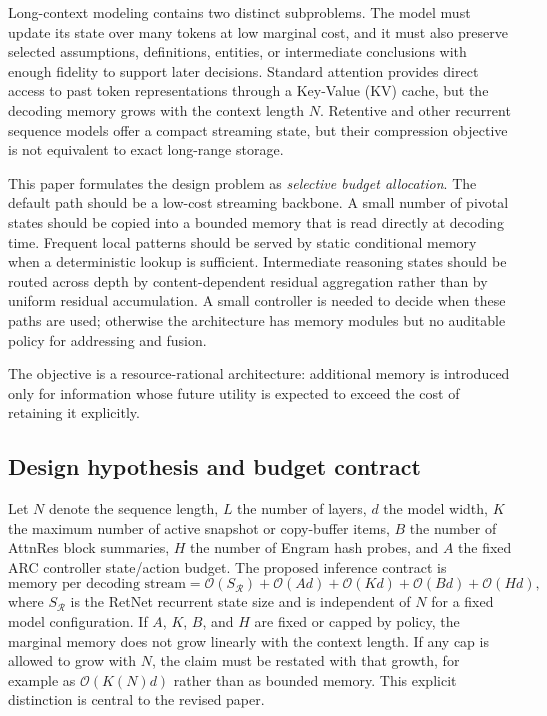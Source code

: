 \documentclass[11pt]{article}
\newcommand{\Ret}{\mathcal{R}}
\newcommand{\Oh}{\mathcal{O}}
\begin{document}
Long-context modeling contains two distinct subproblems. The model must update its state over many tokens at low marginal cost, and it must also preserve selected assumptions, definitions, entities, or intermediate conclusions with enough fidelity to support later decisions. Standard attention provides direct access to past token representations through a Key-Value (KV) cache, but the decoding memory grows with the context length $N$. Retentive and other recurrent sequence models offer a compact streaming state, but their compression objective is not equivalent to exact long-range storage.

This paper formulates the design problem as \emph{selective budget allocation}. The default path should be a low-cost streaming backbone. A small number of pivotal states should be copied into a bounded memory that is read directly at decoding time. Frequent local patterns should be served by static conditional memory when a deterministic lookup is sufficient. Intermediate reasoning states should be routed across depth by content-dependent residual aggregation rather than by uniform residual accumulation. A small controller is needed to decide when these paths are used; otherwise the architecture has memory modules but no auditable policy for addressing and fusion.

The objective is a resource-rational architecture: additional memory is introduced only for information whose future utility is expected to exceed the cost of retaining it explicitly.

\subsection{Design hypothesis and budget contract}

Let $N$ denote the sequence length, $L$ the number of layers, $d$ the model width, $K$ the maximum number of active snapshot or copy-buffer items, $B$ the number of AttnRes block summaries, $H$ the number of Engram hash probes, and $A$ the fixed ARC controller state/action budget. The proposed inference contract is
\begin{equation}
\label{eq:budget-contract}
\text{memory per decoding stream}
= \Oh(S_{\Ret}) + \Oh(Ad) + \Oh(Kd) + \Oh(Bd) + \Oh(Hd),
\end{equation}
where $S_{\Ret}$ is the RetNet recurrent state size and is independent of $N$ for a fixed model configuration. If $A$, $K$, $B$, and $H$ are fixed or capped by policy, the marginal memory does not grow linearly with the context length. If any cap is allowed to grow with $N$, the claim must be restated with that growth, for example as $\Oh(K(N)d)$ rather than as bounded memory. This explicit distinction is central to the revised paper.
\end{document}
